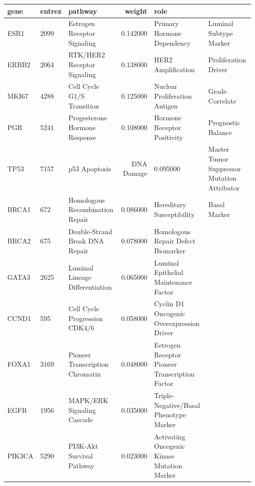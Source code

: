 \begin{tabular}{lllrl}
\toprule
gene & entrez & pathway & weight & role \\
\midrule
ESR1 & 2099 & Estrogen Receptor Signaling & 0.142000 & Primary Hormone Dependency & Luminal Subtype Marker \\
ERBB2 & 2064 & RTK/HER2 Receptor Signaling & 0.138000 & HER2 Amplification & Proliferation Driver \\
MKI67 & 4288 & Cell Cycle G1/S Transition & 0.125000 & Nuclear Proliferation Antigen & Grade Correlate \\
PGR & 5241 & Progesterone Hormone Response & 0.108000 & Hormone Receptor Positivity & Prognostic Balance \\
TP53 & 7157 & p53 Apoptosis & DNA Damage & 0.095000 & Master Tumor Suppressor Mutation Attributor \\
BRCA1 & 672 & Homologous Recombination Repair & 0.086000 & Hereditary Susceptibility & Basal Marker \\
BRCA2 & 675 & Double-Strand Break DNA Repair & 0.078000 & Homologous Repair Defect Biomarker \\
GATA3 & 2625 & Luminal Lineage Differentiation & 0.065000 & Luminal Epithelial Maintenance Factor \\
CCND1 & 595 & Cell Cycle Progression CDK4/6 & 0.058000 & Cyclin D1 Oncogenic Overexpression Driver \\
FOXA1 & 3169 & Pioneer Transcription Chromatin & 0.048000 & Estrogen Receptor Pioneer Transcription Factor \\
EGFR & 1956 & MAPK/ERK Signaling Cascade & 0.035000 & Triple-Negative/Basal Phenotype Marker \\
PIK3CA & 5290 & PI3K-Akt Survival Pathway & 0.023000 & Activating Oncogenic Kinase Mutation Marker \\
\bottomrule
\end{tabular}

